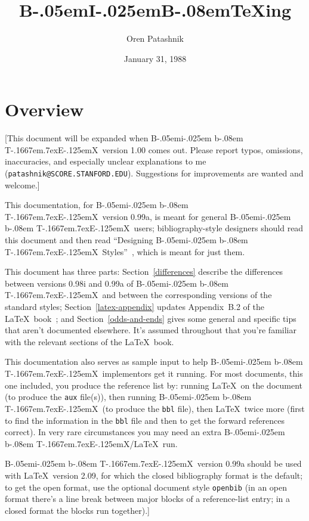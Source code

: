 
\def\BibTeX{{\rm B\kern-.05em{\sc i\kern-.025em b}\kern-.08em
    T\kern-.1667em\lower.7ex\hbox{E}\kern-.125emX}}

\title{B\kern-.05em{\large I}\kern-.025em{\large B}\kern-.08em\TeX ing}
\author{Oren Patashnik}
\date{January 31, 1988}



\maketitle

\section{Overview}

[This document will be expanded when \BibTeX\ version 1.00 comes out.
Please report typos, omissions, inaccuracies,
and especially unclear explanations
to me ({\tt patashnik@SCORE.STANFORD.EDU}).
Suggestions for improvements are wanted and welcome.]

This documentation, for \BibTeX\ version 0.99a,
is meant for general \BibTeX\ users;
bibliography-style designers should read this document
and then read ``Designing \BibTeX\ Styles''~\cite{btxhak},
which is meant for just them.

This document has three parts:
Section~\ref{differences}
describe the differences between versions 0.98i and 0.99a
of \BibTeX\ and between the corresponding versions of the standard styles;
Section~\ref{latex-appendix}
updates Appendix~B.2 of the \LaTeX\ book~\cite{latex};
and Section~\ref{odds-and-ends}
gives some general and specific tips
that aren't documented elsewhere.
It's assumed throughout that you're familiar with
the relevant sections of the \LaTeX\ book.

This documentation also serves as sample input to help
\BibTeX\ implementors get it running.
For most documents, this one included, you produce the reference list by:
running \LaTeX\ on the document (to produce the {\tt aux} file(s)),
then running \BibTeX\ (to produce the {\tt bbl} file),
then \LaTeX\ twice more (first to find the information in the {\tt bbl} file
and then to get the forward references correct).
In very rare circumstances you may need an extra \BibTeX/\LaTeX\ run.

\BibTeX\ version 0.99a should be used with \LaTeX\ version 2.09,
for which the closed bibliography format is the default;
to get the open format, use the optional document style {\tt openbib}
(in an open format there's a line break between major blocks of a
reference-list entry; in a closed format the blocks run together).]

